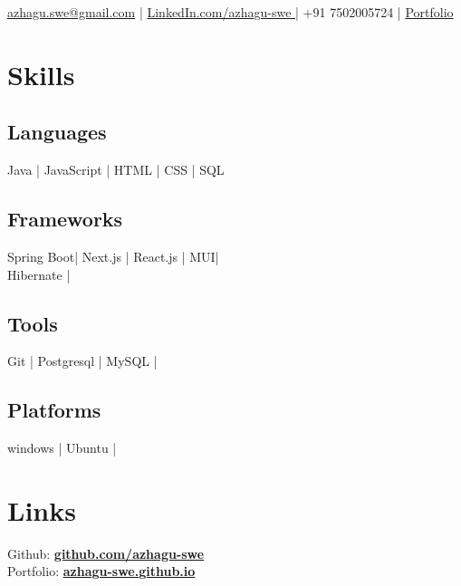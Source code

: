 \documentclass[]{azhagu-swe-resume-openfont}
\begin{document}
\lastupdated

 { 
\href{mailto:azhagu.swe@gmail.com}{azhagu.swe@gmail.com} | \href{https://www.linkedin.com/in/azhagu-swe/}{LinkedIn.com/azhagu-swe } | +91 7502005724 | \href{https://azhagu-swe.github.io/portfolio/}{Portfolio}
}


\begin{minipage}[t]{0.33\textwidth} 


\section{Skills}
\subsection{Languages}
Java | JavaScript | HTML | CSS | SQL  
\subsection{Frameworks}
Spring Boot| Next.js | React.js | MUI|\\
 Hibernate  |
 \subsection{Tools}
 Git | Postgresql | MySQL |
 \subsection{Platforms}
 windows | Ubuntu |
 
\sectionsep

\section{Links} 
Github: \href{https://github.com/azhagu-swe}{\bf  github.com/azhagu-swe } \\
Portfolio:  \href{https://azhagu-swe.github.io/portfolio/}{\bf azhagu-swe.github.io} \\


\end{minipage}
\end{document}
